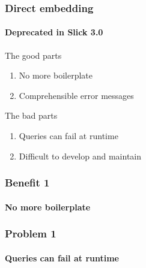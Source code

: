 \documentclass[xcolor=dvipsnames]{beamer}
\theoremstyle{definition}
\begin{document}
\begin{frame}[fragile]
    \frametitle{Direct embedding}
    \framesubtitle{Deprecated in Slick 3.0}
    \begin{block}{The good parts}
        \begin{enumerate}
            \item No more boilerplate
            \item Comprehensible error messages
        \end{enumerate}
    \end{block}
    \begin{block}{The bad parts}
        \begin{enumerate}
            \item Queries can fail at runtime
            \item Difficult to develop and maintain
        \end{enumerate}
    \end{block}
\end{frame}

\begin{frame}[fragile]
    \frametitle{Benefit 1}
    \framesubtitle{No more boilerplate}
    \begin{block}{}
        
    \end{block}
\end{frame}

\begin{frame}[fragile]
    \frametitle{Problem 1}
    \framesubtitle{Queries can fail at runtime}
    \begin{block}{}
        
    \end{block}
\end{frame}

\end{document}
